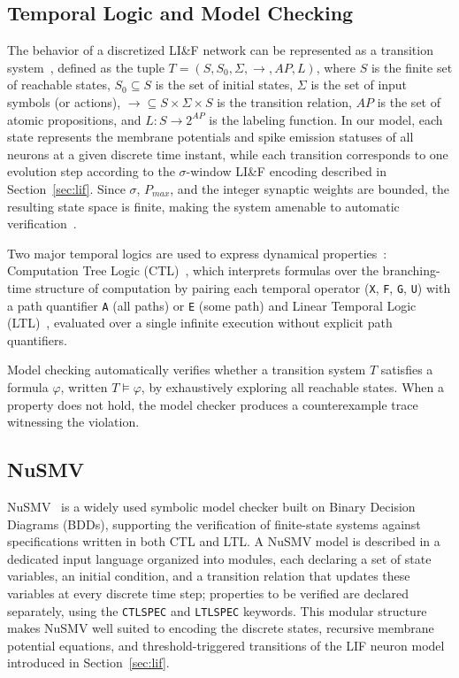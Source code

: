 \documentclass[
]{ceurart}
\begin{document}
\subsection{Temporal Logic and Model Checking}
\label{sec:tl-mc}

The behavior of a discretized LI\&F network can be represented as a
transition system~\cite{Clarke1999}, defined as the tuple
$T=(S,S_0,\Sigma,\rightarrow,AP,L)$, where $S$ is the finite set of
reachable states, $S_0 \subseteq S$ is the set of initial states,
$\Sigma$ is the set of input symbols (or actions), $\rightarrow \subseteq
S \times \Sigma \times S$ is the transition relation, $AP$ is the set of
atomic propositions, and $L:S \rightarrow 2^{AP}$ is the labeling
function. In our model, each state represents the membrane potentials and
spike emission statuses of all neurons at a given discrete time instant,
while each transition corresponds to one evolution step according to the
$\sigma$-window LI\&F encoding described in
Section~\ref{sec:lif}. Since $\sigma$, $P_{max}$, and the integer synaptic
weights are bounded, the resulting state space is finite, making the
system amenable to automatic verification~\cite{DeMaria2016,DeMaria2017}.

Two major temporal logics are used to express dynamical
properties~\cite{Clarke1999}: Computation Tree Logic
(CTL)~\cite{Clarke1986}, which interprets formulas over the branching-time
structure of computation by pairing each temporal operator (\texttt{X},
\texttt{F}, \texttt{G}, \texttt{U}) with a path quantifier \texttt{A} (all
paths) or \texttt{E} (some path) and Linear Temporal Logic (LTL)~\cite{Pnueli1977}, evaluated over
a single infinite execution without explicit path quantifiers.

Model checking automatically verifies whether a transition system $T$
satisfies a formula $\varphi$, written $T \models \varphi$, by exhaustively
exploring all reachable states. When a property does not hold, the
model checker produces a counterexample trace witnessing the violation.

\subsection{NuSMV}
\label{sec:nusmv}

NuSMV~\cite{Cimatti1999} is a widely used symbolic model checker built on
Binary Decision Diagrams (BDDs), supporting the verification of finite-state
systems against specifications written in both CTL and LTL. A NuSMV model is
described in a dedicated input language organized into modules, each
declaring a set of state variables, an initial condition, and a transition
relation that updates these variables at every discrete time step;
properties to be verified are declared separately, using the
\texttt{CTLSPEC} and \texttt{LTLSPEC} keywords. This modular structure makes
NuSMV well suited to encoding the discrete states, recursive membrane
potential equations, and threshold-triggered transitions of the LIF neuron
model introduced in Section~\ref{sec:lif}.
\end{document}
